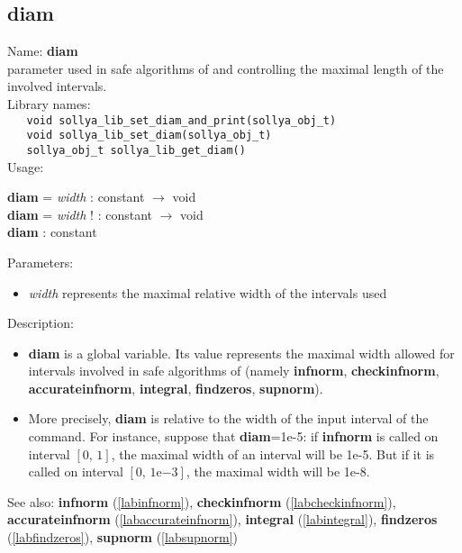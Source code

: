 \subsection{diam}
\label{labdiam}
\noindent Name: \textbf{diam}\\
\phantom{aaa}parameter used in safe algorithms of \sollya and controlling the maximal length of the involved intervals.\\[0.2cm]
\noindent Library names:\\
\verb|   void sollya_lib_set_diam_and_print(sollya_obj_t)|\\
\verb|   void sollya_lib_set_diam(sollya_obj_t)|\\
\verb|   sollya_obj_t sollya_lib_get_diam()|\\[0.2cm]
\noindent Usage: 
\begin{center}
\textbf{diam} = \emph{width} : \textsf{constant} $\rightarrow$ \textsf{void}\\
\textbf{diam} = \emph{width} ! : \textsf{constant} $\rightarrow$ \textsf{void}\\
\textbf{diam} : \textsf{constant}\\
\end{center}
Parameters: 
\begin{itemize}
\item \emph{width} represents the maximal relative width of the intervals used
\end{itemize}
\noindent Description: \begin{itemize}

\item \textbf{diam} is a global variable. Its value represents the maximal width allowed
   for intervals involved in safe algorithms of \sollya (namely \textbf{infnorm},
   \textbf{checkinfnorm}, \textbf{accurateinfnorm}, \textbf{integral}, \textbf{findzeros}, \textbf{supnorm}).

\item More precisely, \textbf{diam} is relative to the width of the input interval of
   the command. For instance, suppose that \textbf{diam}=1e-5: if \textbf{infnorm} is called
   on interval $[0,\,1]$, the maximal width of an interval will be 1e-5. But if it
   is called on interval $[0,\,1\mathrm{e}{-3}]$, the maximal width will be 1e-8.
\end{itemize}
See also: \textbf{infnorm} (\ref{labinfnorm}), \textbf{checkinfnorm} (\ref{labcheckinfnorm}), \textbf{accurateinfnorm} (\ref{labaccurateinfnorm}), \textbf{integral} (\ref{labintegral}), \textbf{findzeros} (\ref{labfindzeros}), \textbf{supnorm} (\ref{labsupnorm})
